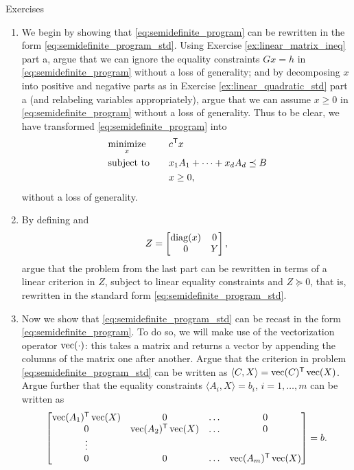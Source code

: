 \begin{xcb}{Exercises}
\begin{enumerate}[label=\thechapter.\arabic*]
\begin{enumerate}[label=\alph*.]
\item We begin by showing that \eqref{eq:semidefinite_program} can be 
  rewritten in the form \eqref{eq:semidefinite_program_std}. Using Exercise  
  \ref{ex:linear_matrix_ineq} part a, argue that we can ignore the equality
  constraints $Gx = h$ in \eqref{eq:semidefinite_program} without a loss of
  generality; and by decomposing $x$ into positive and negative parts as in
  Exercise \ref{ex:linear_quadratic_std} part a (and relabeling variables
  appropriately), argue that we can assume $x \geq 0$ in
  \eqref{eq:semidefinite_program} without a loss of generality. Thus to be
  clear, we have transformed \eqref{eq:semidefinite_program} into  
  \begin{alignat*}{2}
  &\operatorname*{minimize}_x \quad && c^{\mathsf{T}} x \\
  &\operatorname{subject\,\,to} \quad && x_1A_1 + \cdots + x_d A_d \preceq B \\  
  & && x \geq 0,
  \end{alignat*}
  without a loss of generality. 

\item By defining  and 
  \[
  Z = \begin{bmatrix} \operatorname{diag}(x) & 0 \\ 0 & Y \end{bmatrix},
  \]
  argue that the problem from the last part can be rewritten in terms of a
  linear criterion in $Z$, subject to linear equality constraints and $Z \succeq
  0$, that is, rewritten in the standard form
  \eqref{eq:semidefinite_program_std}.       

\item Now we show that \eqref{eq:semidefinite_program_std} can be recast in
  the form \eqref{eq:semidefinite_program}. To do so, we will make use of the
  vectorization operator $\operatorname{vec}(\cdot)$: this takes a matrix and returns a
  vector by appending the columns of the matrix one after another. Argue that
  the criterion in problem \eqref{eq:semidefinite_program_std} can be written as 
  $\langle C, X \rangle = \operatorname{vec}(C)^{\mathsf{T}} \operatorname{vec}(X)$. Argue further that the equality
  constraints $\langle A_i, X \rangle = b_i$, $i=1,\ldots,m$ can be written as
  \[
  \begin{bmatrix}
  \operatorname{vec}(A_1)^{\mathsf{T}} \operatorname{vec}(X) & 0 & \ldots & 0 \\
  0 & \operatorname{vec}(A_2)^{\mathsf{T}} \operatorname{vec}(X) & \ldots & 0 \\
  \vdots & & & \\
  0 & 0 & \ldots & \operatorname{vec}(A_m)^{\mathsf{T}} \operatorname{vec}(X) \\
  \end{bmatrix} = b.
  \]


\end{enumerate}
\end{enumerate}
\end{xcb}
